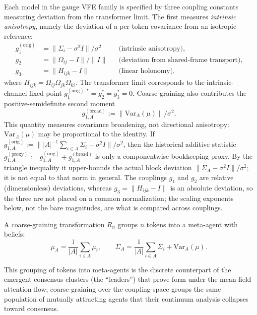 \documentclass[twoside,11pt]{article}
\begin{document}
Each model in the gauge VFE family is specified by three coupling constants measuring deviation from the transformer limit. The first measures \emph{intrinsic anisotropy}, namely the deviation of a per-token covariance from an isotropic reference:
\begin{align}
g_1^{(\mathrm{orig})} &= \|\Sigma_i - \sigma^2 I\| / \sigma^2 & &\text{(intrinsic anisotropy)}, \label{eq:g1_def} \\
g_2 &= \|\Omega_{ij} - I\| / \|I\| & &\text{(deviation from shared-frame transport)}, \label{eq:g2_def} \\
g_3 &= \|H_{ijk} - I\| & &\text{(linear holonomy)}, \label{eq:g3_def}
\end{align}
where $H_{ijk} = \Omega_{ij} \Omega_{jk} \Omega_{ki}$. The transformer limit corresponds to the intrinsic-channel fixed point $g_1^{(\mathrm{orig}),*} = g_2^* = g_3^* = 0$. Coarse-graining also contributes the positive-semidefinite second moment
\begin{equation}
g_{1,A}^{(\mathrm{broad})}:=\|\mathrm{Var}_A(\mu)\|/\sigma^2.
\label{eq:g1_broadening}
\end{equation}
This quantity measures covariance broadening, not directional anisotropy: $\mathrm{Var}_A(\mu)$ may be proportional to the identity. If $g_{1,A}^{(\mathrm{orig})}:=\| |A|^{-1}\sum_{i\in A}\Sigma_i-\sigma^2I\|/\sigma^2$, then the historical additive statistic $g_{1,A}^{(\mathrm{proxy})}:=g_{1,A}^{(\mathrm{orig})}+g_{1,A}^{(\mathrm{broad})}$ is only a componentwise bookkeeping proxy. By the triangle inequality it upper-bounds the actual block deviation $\|\Sigma_A-\sigma^2I\|/\sigma^2$; it is not equal to that norm in general. The couplings $g_1$ and $g_2$ are relative (dimensionless) deviations, whereas $g_3 = \|H_{ijk} - I\|$ is an absolute deviation, so the three are not placed on a common normalization; the scaling exponents below, not the bare magnitudes, are what is compared across couplings.

A coarse-graining transformation $R_n$ groups $n$ tokens into a meta-agent with beliefs:
\begin{equation}
\mu_A = \frac{1}{|A|} \sum_{i \in A} \mu_i, \qquad
\Sigma_A = \frac{1}{|A|} \sum_{i \in A} \Sigma_i + \mathrm{Var}_A(\mu).
\label{eq:meta_agent_beliefs}
\end{equation}

This grouping of tokens into meta-agents is the discrete counterpart of the emergent consensus clusters (the ``leaders'') that \citet{geshkovski2023mathematical} prove form under the mean-field attention flow; coarse-graining over the coupling-space groups the same population of mutually attracting agents that their continuum analysis collapses toward consensus.
\end{document}
